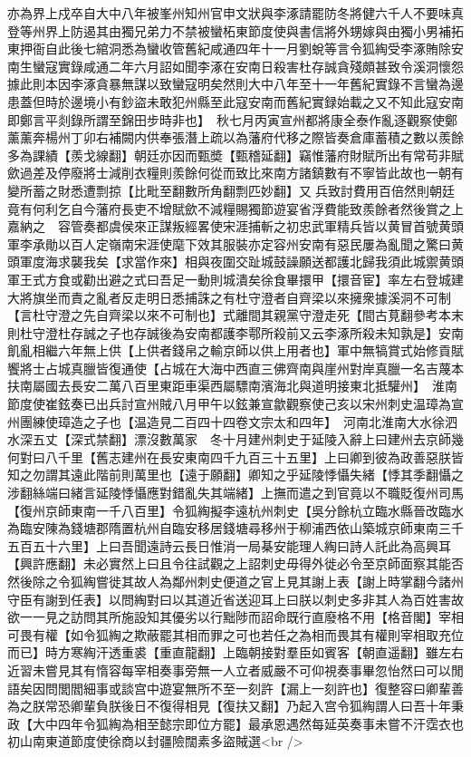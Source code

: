 亦為界上戍卒自大中八年被峯州知州官申文狀與李涿請罷防冬將健六千人不要味真登等州界上防遏其由獨兄弟力不禁被蠻柘東節度使與書信將外甥嫁與由獨小男補拓東押衙自此後七綰洞悉為蠻收管舊紀咸通四年十一月劉蛻等言令狐綯受李涿賄除安南生蠻寇實錄咸通二年六月詔如聞李涿在安南日殺害杜存誠貪殘頗甚致令溪洞懷怨據此則本因李涿貪暴無謀以致蠻寇明矣然則大中八年至十一年舊紀實錄不言蠻為邊患蓋但時於邊境小有鈔盜未敢犯州縣至此寇安南而舊紀實録始載之又不知此寇安南即鄭言平剡錄所謂至錦田步時非也】　秋七月丙寅宣州都將康全泰作亂逐觀察使鄭薰薰奔楊州丁卯右補闕内供奉張潛上疏以為藩府代移之際皆奏倉庫蓄積之數以羨餘多為課績【羨戈線翻】朝廷亦因而甄奬【甄稽延翻】竊惟藩府財賦所出有常苟非賦歛過差及停廢將士減削衣糧則羨餘何從而致比來南方諸鎮數有不寧皆此故也一朝有變所蓄之財悉遭剽掠【比毗至翻數所角翻剽匹妙翻】又兵致討費用百倍然則朝廷竟有何利乞自今藩府長吏不增賦歛不減糧賜獨節遊宴省浮費能致羨餘者然後賞之上嘉納之　容管奏都虞侯來正謀叛經畧使宋涯捕斬之初忠武軍精兵皆以黄冒首號黄頭軍李承勛以百人定嶺南宋涯使麾下效其服裝亦定容州安南有惡民屢為亂聞之驚曰黄頭軍度海求襲我矣【求當作來】相與夜圍交趾城鼓譟願送都護北歸我須此城禦黄頭軍王式方食或勸出避之式曰吾足一動則城潰矣徐食畢擐甲【擐音宦】率左右登城建大將旗坐而責之亂者反走明日悉捕誅之有杜守澄者自齊梁以來擁衆據溪洞不可制【言杜守澄之先自齊梁以來不可制也】式離間其親黨守澄走死【間古莧翻參考本末則杜守澄杜存誠之子也存誠後為安南都護李鄠所殺前又云李涿所殺未知孰是】安南飢亂相繼六年無上供【上供者錢帛之輸京師以供上用者也】軍中無犒賞式始修貢賦饗將士占城真臘皆復通使【占城在大海中西直三佛齊南與崖州對岸真臘一名吉蔑本扶南屬國去長安二萬八百里東距車渠西屬驃南濱海北與道明接東北抵驩州】　淮南節度使崔鉉奏已出兵討宣州賊八月甲午以鉉兼宣歙觀察使己亥以宋州刺史温璋為宣州團練使璋造之子也【温造見二百四十四卷文宗太和四年】　河南北淮南大水徐泗水深五丈【深式禁翻】漂沒數萬家　冬十月建州刺史于延陵入辭上曰建州去京師幾何對曰八千里【舊志建州在長安東南四千九百三十五里】上曰卿到彼為政善惡朕皆知之勿謂其遠此階前則萬里也【遠于願翻】卿知之乎延陵悸懾失緒【悸其季翻懾之涉翻絲端曰緒言延陵悸懾應對錯亂失其端緒】上撫而遣之到官竟以不職貶復州司馬【復州京師東南一千八百里】令狐綯擬李遠杭州刺史【吳分餘杭立臨水縣晉改臨水為臨安陳為錢塘郡隋置杭州自臨安移居錢塘尋移州于柳浦西依山築城京師東南三千五百五十六里】上曰吾聞遠詩云長日惟消一局棊安能理人綯曰詩人託此為高興耳【興許應翻】未必實然上曰且令往試觀之上詔刺史毋得外徙必令至京師面察其能否然後除之令狐綯嘗徙其故人為鄰州刺史便道之官上見其謝上表【謝上時掌翻今諸州守臣有謝到任表】以問綯對曰以其道近省送迎耳上曰朕以刺史多非其人為百姓害故欲一一見之訪問其所施設知其優劣以行黜陟而詔命既行直廢格不用【格音閣】宰相可畏有權【如令狐綯之欺蔽罷其相而罪之可也若任之為相而畏其有權則宰相取充位而已】時方寒綯汗透重裘【重直龍翻】上臨朝接對羣臣如賓客【朝直遥翻】雖左右近習未嘗見其有惰容每宰相奏事旁無一人立者威嚴不可仰視奏事畢忽怡然曰可以閒語矣因問閭閻細事或談宫中遊宴無所不至一刻許【漏上一刻許也】復整容曰卿輩善為之朕常恐卿輩負朕後日不復得相見【復扶又翻】乃起入宫令狐綯謂人曰吾十年秉政【大中四年令狐綯為相至懿宗即位方罷】最承恩遇然每延英奏事未嘗不汗霑衣也初山南東道節度使徐商以封疆險闊素多盜賊選<br />
